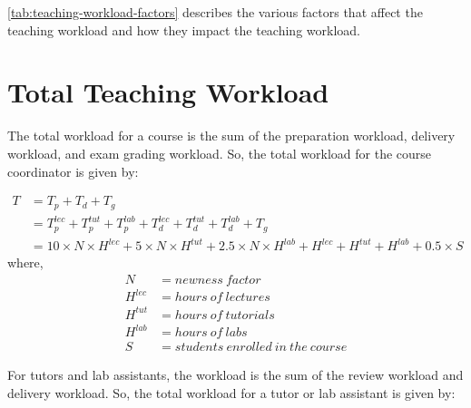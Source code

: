\autoref{tab:teaching-workload-factors} describes the various factors that affect the teaching workload and how they impact the teaching workload.

\section{Total Teaching Workload}

The total workload for a course is the sum of the preparation workload, delivery workload, and exam grading workload. So, the total workload for the course coordinator is given by:

\begin{equation}
  \label{eqn:total-workload}
  \begin{aligned}
    T & = T_p + T_d + T_g                                                                                                                   \\
      & = T_p^{lec} + T_p^{tut} + T_p^{lab} + T_d^{lec} + T_d^{tut} + T_d^{lab} + T_g                                                       \\
      & = 10 \times N \times H^{lec} + 5 \times N \times H^{tut} + 2.5 \times N \times H^{lab} + H^{lec} + H^{tut} + H^{lab} + 0.5 \times S
  \end{aligned}
\end{equation}
where,
\begin{equation}
  \nonumber
  \begin{aligned}
    N       & = newness\ factor                     \\
    H^{lec} & = hours\ of\ lectures                 \\
    H^{tut} & = hours\ of\ tutorials                \\
    H^{lab} & = hours\ of\ labs                     \\
    S       & = students\ enrolled\ in\ the\ course
  \end{aligned}
\end{equation}

For tutors and lab assistants, the workload is the sum of the review workload and delivery workload. So, the total workload for a tutor or lab assistant is given by:


